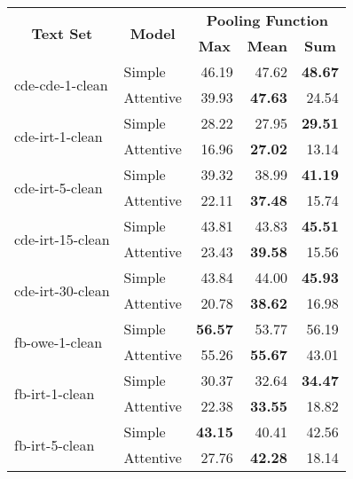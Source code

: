 \begin{tabular}{| l | l | r | r | r |}
    \hline

    \multicolumn{1}{|c|}{\multirow{2}{*}{\textbf{Text Set}}} &
    \multicolumn{1}{|c|}{\multirow{2}{*}{\textbf{Model}}} &
    \multicolumn{3}{|c|}{\textbf{Pooling Function}} \\

    &
    &
    \multicolumn{1}{|c|}{\textbf{Max}} &
    \multicolumn{1}{|c|}{\textbf{Mean}} &
    \multicolumn{1}{|c|}{\textbf{Sum}} \\

    \hline \hline

    \multirow{2}{*}{cde-cde-1-clean}
    & Simple    & 46.19 & 47.62 & \textbf{48.67} \\
    & Attentive & 39.93 & \textbf{47.63} & 24.54 \\ \hline
    
    \multirow{2}{*}{cde-irt-1-clean}
    & Simple    & 28.22 & 27.95 & \textbf{29.51} \\
    & Attentive & 16.96 & \textbf{27.02} & 13.14 \\ \hline
    
    \multirow{2}{*}{cde-irt-5-clean}
    & Simple    & 39.32 & 38.99 & \textbf{41.19} \\
    & Attentive & 22.11 & \textbf{37.48} & 15.74 \\ \hline
    
    \multirow{2}{*}{cde-irt-15-clean}
    & Simple    & 43.81 & 43.83 & \textbf{45.51} \\
    & Attentive & 23.43 & \textbf{39.58} & 15.56 \\ \hline
    
    \multirow{2}{*}{cde-irt-30-clean}
    & Simple    & 43.84 & 44.00 & \textbf{45.93} \\
    & Attentive & 20.78 & \textbf{38.62} & 16.98 \\ \hline \hline

    \multirow{2}{*}{fb-owe-1-clean}
    & Simple    & \textbf{56.57} & 53.77 & 56.19 \\
    & Attentive & 55.26 & \textbf{55.67} & 43.01 \\ \hline

    \multirow{2}{*}{fb-irt-1-clean}
    & Simple    & 30.37 & 32.64 & \textbf{34.47} \\
    & Attentive & 22.38 & \textbf{33.55} & 18.82 \\ \hline
    
    \multirow{2}{*}{fb-irt-5-clean}
    & Simple    & \textbf{43.15} & 40.41 & 42.56 \\
    & Attentive & 27.76 & \textbf{42.28} & 18.14 \\ \hline
    

\end{tabular}
